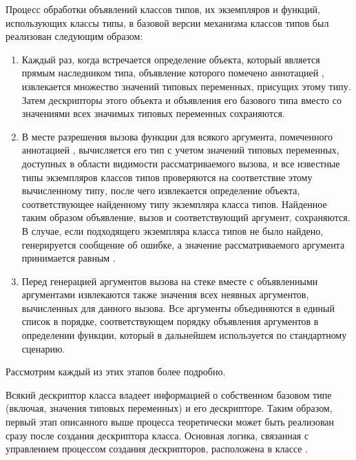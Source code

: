 Процесс обработки объявлений классов типов, их экземпляров и функций, использующих классы типы, в базовой версии механизма классов типов был реализован следующим образом:  
\begin{enumerate}
    \item Каждый раз, когда встречается определение объекта, который является прямым наследником типа, объявление которого помечено аннотацией , извлекается множество значений типовых переменных, присущих этому типу. Затем дескрипторы этого объекта и объявления его базового типа вместо со значениями всех значимых типовых переменных сохраняются. 
    \item В месте разрешения вызова функции для всякого аргумента, помеченного аннотацией , вычисляется его тип с учетом значений типовых переменных, доступных в области видимости рассматриваемого вызова, и все известные типы экземпляров классов типов проверяются на соответствие этому вычисленному типу, после чего извлекается определение объекта, соответствующее найденному типу экземпляра класса типов. Найденное таким образом объявление, вызов и соответствующий аргумент, сохраняются. В случае, если подходящего экземпляра класса типов не было найдено, генерируется сообщение об ошибке, а значение рассматриваемого аргумента принимается равным . 
    \item Перед генерацией аргументов вызова на стеке вместе с объявленными аргументами извлекаются также значения всех неявных аргументов, вычисленных для данного вызова. Все аргументы объединяются в единый список в порядке, соответствующем порядку объявления аргументов в определении функции, который в дальнейшем используется по стандартному сценарию.    
\end{enumerate}   
Рассмотрим каждый из этих этапов более подробно.

Всякий дескриптор класса владеет информацией о собственном базовом типе (включая, значения типовых переменных) и его дескрипторе. Таким образом, первый этап описанного выше процесса теоретически может быть реализован сразу после создания дескриптора класса. Основная логика, связанная с управлением процессом создания дескрипторов, расположена в классе . 

